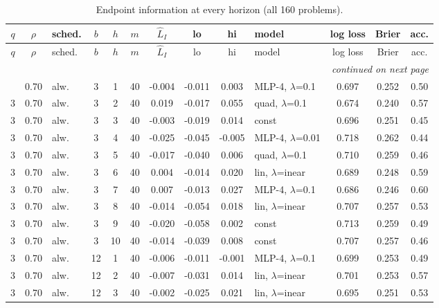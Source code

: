 \begin{scriptsize}
\setlength{\tabcolsep}{3pt}
\begin{longtable}{cclcc c ccc l ccc}
\caption{Endpoint information at every horizon (all 160 problems).}\label{tab:app-endpoint}\\
\toprule
$q$ & $\rho$ & sched. & $b$ & $h$ & $m$ & $\widehat L_I$ & lo & hi & model & log loss & Brier & acc. \\
\midrule
\endfirsthead
\toprule
$q$ & $\rho$ & sched. & $b$ & $h$ & $m$ & $\widehat L_I$ & lo & hi & model & log loss & Brier & acc. \\
\midrule
\endhead
\midrule
\multicolumn{13}{r}{\emph{continued on next page}}\\
\endfoot
\bottomrule
\endlastfoot
3 & 0.70 & alw. & 3 & 1 & 40 & -0.004 & -0.011 & 0.003 & MLP-4, $\lambda$=0.1 & 0.697 & 0.252 & 0.50 \\
3 & 0.70 & alw. & 3 & 2 & 40 & 0.019 & -0.017 & 0.055 & quad, $\lambda$=0.1 & 0.674 & 0.240 & 0.57 \\
3 & 0.70 & alw. & 3 & 3 & 40 & -0.003 & -0.019 & 0.014 & const & 0.696 & 0.251 & 0.45 \\
3 & 0.70 & alw. & 3 & 4 & 40 & -0.025 & -0.045 & -0.005 & MLP-4, $\lambda$=0.01 & 0.718 & 0.262 & 0.44 \\
3 & 0.70 & alw. & 3 & 5 & 40 & -0.017 & -0.040 & 0.006 & quad, $\lambda$=0.1 & 0.710 & 0.259 & 0.46 \\
3 & 0.70 & alw. & 3 & 6 & 40 & 0.004 & -0.014 & 0.020 & lin, $\lambda$=inear & 0.689 & 0.248 & 0.59 \\
3 & 0.70 & alw. & 3 & 7 & 40 & 0.007 & -0.013 & 0.027 & MLP-4, $\lambda$=0.1 & 0.686 & 0.246 & 0.60 \\
3 & 0.70 & alw. & 3 & 8 & 40 & -0.014 & -0.054 & 0.018 & lin, $\lambda$=inear & 0.707 & 0.257 & 0.53 \\
3 & 0.70 & alw. & 3 & 9 & 40 & -0.020 & -0.058 & 0.002 & const & 0.713 & 0.259 & 0.49 \\
3 & 0.70 & alw. & 3 & 10 & 40 & -0.014 & -0.039 & 0.008 & const & 0.707 & 0.257 & 0.46 \\
3 & 0.70 & alw. & 12 & 1 & 40 & -0.006 & -0.011 & -0.001 & MLP-4, $\lambda$=0.1 & 0.699 & 0.253 & 0.49 \\
3 & 0.70 & alw. & 12 & 2 & 40 & -0.007 & -0.031 & 0.014 & lin, $\lambda$=inear & 0.701 & 0.253 & 0.57 \\
3 & 0.70 & alw. & 12 & 3 & 40 & -0.002 & -0.025 & 0.021 & lin, $\lambda$=inear & 0.695 & 0.251 & 0.53 \\

\end{longtable}
\end{scriptsize}
